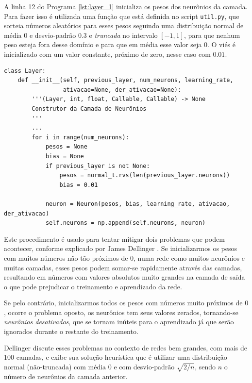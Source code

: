 A linha 12 do Programa \ref{lst:layer_1} inicializa os pesos dos neurônios da camada. Para fazer isso é utilizada uma função que está definida no script \texttt{util.py}, que sorteia números aleatórios para esses pesos seguindo uma distribuição normal de média $0$ e desvio-padrão $0.3$ e \emph{truncada} no intervalo $[-1, 1]$, para que nenhum peso esteja fora desse domínio e para que em média esse valor seja $0$. O viés é inicializado com um valor constante, próximo de zero, nesse caso com $0.01$.
\newline
\estiloR
\begin{lstlisting}[caption={Trecho da classe \eng{Layer}}, label={lst:layer_1}, escapeinside={\%}]
class Layer:
    def __init__(self, previous_layer, num_neurons, learning_rate,
                 ativacao=None, der_ativacao=None):
        '''(Layer, int, float, Callable, Callable) -> None
        Construtor da Camada de Neurônios
        '''
        ...
        for i in range(num_neurons):
            pesos = None
            bias = None
            if previous_layer is not None:
                pesos = normal_t.rvs(len(previous_layer.neurons))
                bias = 0.01
            
            neuron = Neuron(pesos, bias, learning_rate, ativacao, der_ativacao)
            self.neurons = np.append(self.neurons, neuron)
\end{lstlisting}

Este procedimento é usado para tentar mitigar dois problemas que podem acontecer, conforme explicado por James Dellinger \citep{layers_1}. Se inicializarmos os pesos com muitos números não tão próximos de $0$, numa rede como muitos neurônios e muitas camadas, esses pesos podem somar-se rapidamente através das camadas, resultando em números com valores absolutos muito grandes na camada de saída o que pode prejudicar o treinamento e aprendizado da rede.

Se pelo contrário, inicializarmos todos os pesos com números muito próximos de $0$, ocorre o problema oposto, os neurônios tem seus valores zerados, tornando-se \emph{neurônios desativados}, que se tornam inúteis para o aprendizado já que serão ignorados durante o restante do treinamento. 

Dellinger \citep{layers_1} discute esses problemas no contexto de redes bem grandes, com mais de $100$ camadas, e exibe sua solução heurística que é utilizar uma distribuição normal (não-truncada) com média $0$ e com desvio-padrão $\sqrt{2/n}$, sendo $n$ o número de neurônios da camada anterior.

